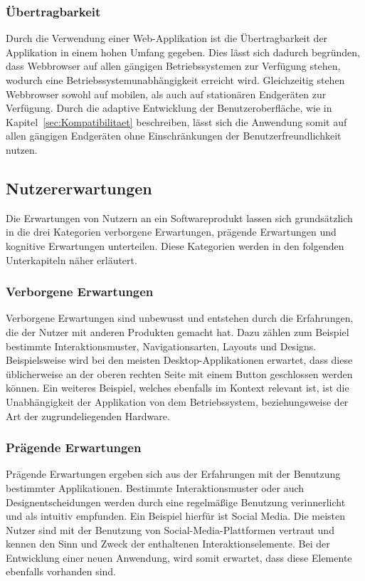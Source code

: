 \subsubsection{Übertragbarkeit}
Durch die Verwendung einer Web-Applikation ist die Übertragbarkeit der Applikation in einem hohen Umfang gegeben.
Dies lässt sich dadurch begründen, dass Webbrowser auf allen gängigen Betriebssystemen zur Verfügung stehen, wodurch eine Betriebssystemunabhängigkeit erreicht wird.
Gleichzeitig stehen Webbrowser sowohl auf mobilen, als auch auf stationären Endgeräten zur Verfügung.
Durch die adaptive Entwicklung der Benutzeroberfläche, wie in Kapitel~\ref{sec:Kompatibilitaet} beschreiben, lässt sich die Anwendung somit auf allen gängigen Endgeräten ohne Einschränkungen der Benutzerfreundlichkeit nutzen.

\subsection{Nutzererwartungen}
Die Erwartungen von Nutzern an ein Softwareprodukt lassen sich grundsätzlich in die drei Kategorien verborgene Erwartungen, prägende Erwartungen und kognitive Erwartungen unterteilen.
Diese Kategorien werden in den folgenden Unterkapiteln näher erläutert.

\subsubsection{Verborgene Erwartungen}
Verborgene Erwartungen sind unbewusst und entstehen durch die Erfahrungen, die der Nutzer mit anderen Produkten gemacht hat.
Dazu zählen zum Beispiel bestimmte Interaktionsmuster, Navigationsarten, Layouts und Designs.
Beispielsweise wird bei den meisten Desktop-Applikationen erwartet, dass diese üblicherweise an der oberen rechten Seite mit einem Button geschlossen werden können.
Ein weiteres Beispiel, welches ebenfalls im Kontext  relevant ist, ist die Unabhängigkeit der Applikation von dem Betriebssystem, beziehungsweise der Art der zugrundeliegenden Hardware.

\subsubsection{Prägende Erwartungen}
Prägende Erwartungen ergeben sich aus der Erfahrungen mit der Benutzung bestimmter Applikationen.
Bestimmte Interaktionsmuster oder auch Designentscheidungen werden durch eine regelmäßige Benutzung verinnerlicht und als intuitiv empfunden.
Ein Beispiel hierfür ist Social Media.
Die meisten Nutzer sind mit der Benutzung von Social-Media-Plattformen vertraut und kennen den Sinn und Zweck der enthaltenen Interaktionselemente.
Bei der Entwicklung einer neuen Anwendung, wird somit erwartet, dass diese Elemente ebenfalls vorhanden sind.

